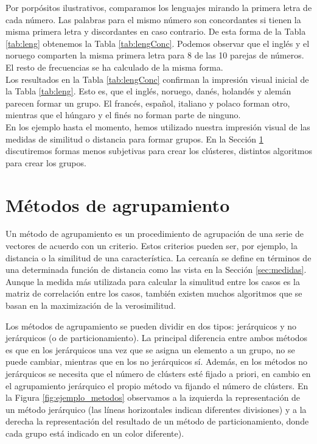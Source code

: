 \documentclass[a4paper, 20pt]{article}
\begin{document}
Por porpósitos ilustrativos, comparamos los lenguajes mirando la primera letra de cada número. Las palabras para el mismo número son concordantes si tienen la misma primera letra y discordantes en caso contrario. De esta forma de la Tabla \ref{tab:leng} obtenemos la Tabla \ref{tab:lengConc}. Podemos observar que el inglés y el noruego comparten la misma primera letra para 8 de las 10 parejas de números. El resto de frecuencias se ha calculado de la misma forma.\\
Los resultados en la Tabla \ref{tab:lengConc} confirman la impresión visual inicial de la Tabla \ref{tab:leng}. Esto es, que el inglés, noruego, danés, holandés y alemán parecen formar un grupo. El francés, español, italiano y polaco forman otro, mientras que el húngaro y el finés no forman parte de ninguno.\\

En los ejemplo hasta el momento, hemos utilizado nuestra impresión visual de las medidas de similitud o distancia para formar grupos. En la Sección \ref{sec:algoritmos} discutiremos formas menos subjetivas para crear los clústeres, distintos algoritmos para crear los grupos. 

\section{Métodos de agrupamiento}\label{sec:algoritmos}
Un método de agrupamiento es un procedimiento de agrupación de una serie de vectores de acuerdo con un criterio. Estos criterios pueden ser, por ejemplo, la distancia o la similitud de una característica. La cercanía se define en términos de una determinada función de distancia como las vista en la Sección \ref{sec:medidas}. Aunque la medida más utilizada para calcular la simulitud entre los casos es la matriz de correlación entre los casos, también existen muchos algoritmos que se basan en la maximización de la verosimilitud.

Los métodos de agrupamiento se pueden dividir en dos tipos: jerárquicos y no jerárquicos (o de particionamiento). La principal diferencia entre ambos métodos es que en los jerárquicos una vez que se asigna un elemento a un grupo, no se puede cambiar, mientras que en los no jerárquicos sí. Además, en los métodos no jerárquicos se necesita que el número de clústers esté fijado a priori, en cambio en el agrupamiento jerárquico el propio método va fijando el número de clústers. En la Figura \ref{fig:ejemplo_metodos} observamos a la izquierda la representación de un método jerárquico (las líneas horizontales indican diferentes divisiones) y a la derecha la representación del resultado de un método de particionamiento, donde cada grupo está indicado en un color diferente).
\end{document}
